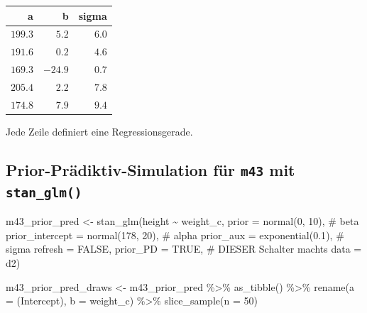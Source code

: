 \documentclass[
  a4paper,
  DIV=11]{scrreprt}
\newenvironment{Shaded}{\begin{snugshade}}{\end{snugshade}}
\newcommand{\AttributeTok}[1]{\textcolor[rgb]{0.40,0.45,0.13}{#1}}
\newcommand{\CommentTok}[1]{\textcolor[rgb]{0.37,0.37,0.37}{#1}}
\newcommand{\ConstantTok}[1]{\textcolor[rgb]{0.56,0.35,0.01}{#1}}
\newcommand{\DecValTok}[1]{\textcolor[rgb]{0.68,0.00,0.00}{#1}}
\newcommand{\FloatTok}[1]{\textcolor[rgb]{0.68,0.00,0.00}{#1}}
\newcommand{\FunctionTok}[1]{\textcolor[rgb]{0.28,0.35,0.67}{#1}}
\newcommand{\NormalTok}[1]{\textcolor[rgb]{0.00,0.23,0.31}{#1}}
\newcommand{\OtherTok}[1]{\textcolor[rgb]{0.00,0.23,0.31}{#1}}
\newcommand{\SpecialCharTok}[1]{\textcolor[rgb]{0.37,0.37,0.37}{#1}}
\newcommand{\StringTok}[1]{\textcolor[rgb]{0.13,0.47,0.30}{#1}}
\theoremstyle{definition}
\theoremstyle{remark}
\begin{document}
\begin{longtable}{rrr}
\toprule
a & b & sigma \\ 
\midrule
$199.3$ & $5.2$ & $6.0$ \\ 
$191.6$ & $0.2$ & $4.6$ \\ 
$169.3$ & $-24.9$ & $0.7$ \\ 
$205.4$ & $2.2$ & $7.8$ \\ 
$174.8$ & $7.9$ & $9.4$ \\ 
\bottomrule
\end{longtable}

Jede Zeile definiert eine Regressionsgerade.

\hypertarget{prior-pruxe4diktiv-simulation-fuxfcr-m43-mit-stan_glm}{%
\subsection{\texorpdfstring{Prior-Prädiktiv-Simulation für \texttt{m43}
mit
\texttt{stan\_glm()}}{Prior-Prädiktiv-Simulation für m43 mit stan\_glm()}}\label{prior-pruxe4diktiv-simulation-fuxfcr-m43-mit-stan_glm}}

\begin{Shaded}
\begin{Highlighting}[]
\NormalTok{m43\_prior\_pred }\OtherTok{\textless{}{-}}
    \FunctionTok{stan\_glm}\NormalTok{(height }\SpecialCharTok{\textasciitilde{}}\NormalTok{ weight\_c, }
             \AttributeTok{prior =} \FunctionTok{normal}\NormalTok{(}\DecValTok{0}\NormalTok{, }\DecValTok{10}\NormalTok{),  }\CommentTok{\# beta}
             \AttributeTok{prior\_intercept =} \FunctionTok{normal}\NormalTok{(}\DecValTok{178}\NormalTok{, }\DecValTok{20}\NormalTok{),  }\CommentTok{\# alpha}
             \AttributeTok{prior\_aux =} \FunctionTok{exponential}\NormalTok{(}\FloatTok{0.1}\NormalTok{),  }\CommentTok{\# sigma}
             \AttributeTok{refresh =} \ConstantTok{FALSE}\NormalTok{, }
             \AttributeTok{prior\_PD =} \ConstantTok{TRUE}\NormalTok{,  }\CommentTok{\# DIESER Schalter macht\textquotesingle{}s}
             \AttributeTok{data =}\NormalTok{ d2)}

\NormalTok{m43\_prior\_pred\_draws }\OtherTok{\textless{}{-}} 
\NormalTok{  m43\_prior\_pred }\SpecialCharTok{\%\textgreater{}\%} 
  \FunctionTok{as\_tibble}\NormalTok{() }\SpecialCharTok{\%\textgreater{}\%} 
  \FunctionTok{rename}\NormalTok{(}\AttributeTok{a =} \StringTok{\textasciigrave{}}\AttributeTok{(Intercept)}\StringTok{\textasciigrave{}}\NormalTok{,}
         \AttributeTok{b =}\NormalTok{ weight\_c) }\SpecialCharTok{\%\textgreater{}\%} 
  \FunctionTok{slice\_sample}\NormalTok{(}\AttributeTok{n =} \DecValTok{50}\NormalTok{)}
\end{Highlighting}
\end{Shaded}
\end{document}
